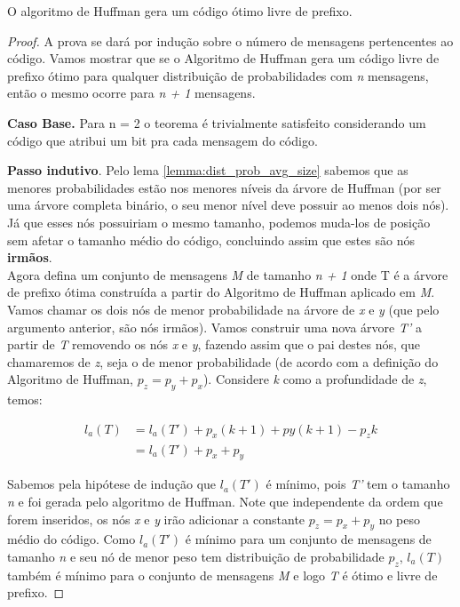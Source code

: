 \begin{theorem} O algoritmo de Huffman gera um código ótimo livre de prefixo.
\begin{proof}
A prova se dará por indução sobre o número de mensagens pertencentes ao código. Vamos mostrar que se o Algoritmo de Huffman gera um código livre de prefixo ótimo para qualquer distribuição de probabilidades com \emph{n} mensagens, então o mesmo ocorre para \emph{n + 1} mensagens.

\item \textbf{Caso Base.} Para n = 2 o teorema é trivialmente satisfeito considerando um código que atribui um bit pra cada mensagem do código.

\item \textbf{Passo indutivo}. Pelo lema \ref{lemma:dist_prob_avg_size} sabemos que as menores probabilidades estão nos menores níveis da árvore de Huffman (por ser uma árvore completa binário, o seu menor nível deve possuir ao menos dois nós). Já que esses nós possuiriam o mesmo tamanho, podemos muda-los de posição sem afetar o tamanho médio do código, concluindo assim que estes são nós \textbf{irmãos}.\\
Agora defina um conjunto de mensagens \emph{M} de tamanho \emph{n + 1} onde T é a árvore de prefixo ótima construída a partir do Algoritmo de Huffman aplicado em \emph{M}. Vamos chamar os dois nós de menor probabilidade na árvore de \emph{x} e \emph{y} (que pelo argumento anterior, são nós irmãos). Vamos construir uma nova árvore \emph{T'} a partir de \emph{T} removendo os nós \emph{x} e \emph{y}, fazendo assim que o pai destes nós, que chamaremos de \emph{z}, seja o de menor probabilidade (de acordo com a definição do Algoritmo de Huffman, $p_z = p_y + p_x$). Considere \emph{k} como a profundidade de \emph{z}, temos:

\begin{align*}
l_a(T) &= l_a(T') + p_x(k + 1) + py(k + 1) - p_z k \\
&= l_a(T') + p_x + p_y
\end{align*}

Sabemos pela hipótese de indução que $l_a(T')$ é mínimo, pois \emph{T'} tem o tamanho \emph{n} e foi gerada pelo algoritmo de Huffman. Note que independente da ordem que forem inseridos, os nós \emph{x} e \emph{y} irão adicionar a constante $p_z = p_x + p_y$ no peso médio do código. Como $l_a(T')$ é mínimo para um conjunto de mensagens de tamanho \emph{n} e seu nó de menor peso tem distribuição de probabilidade $p_z$, $l_a(T)$ também é mínimo para o conjunto de mensagens \emph{M} e logo \emph{T} é ótimo e livre de prefixo. 
\end{proof}
\end{theorem}
